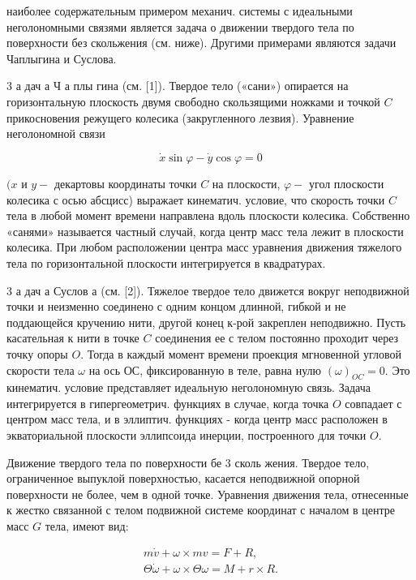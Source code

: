 \documentclass[10pt]{article}
\begin{document}
наиболее содержательным примером механич. системы с идеальными неголономными связями является задача о движении твердого тела по поверхности без скольжения (см. ниже). Другими примерами являются задачи Чаплыгина и Суслова.



3 а дач а Ч а плы гина (см. [1]). Твердое тело («сани») опирается на горизонтальную плоскость двумя свободно скользящими ножками и точкой $C$ прикосновения режущего колесика (закругленного лезвия). Уравнение неголономной связи



\[

\dot{x} \sin \varphi-\dot{y} \cos \varphi=0

\]



$(x$ и $y-$ декартовы координаты точки $C$ на плоскости, $\varphi-$ угол плоскости колесика с осью абсцисс) выражает кинематич. условие, что скорость точки $C$ тела в любой момент времени направлена вдоль плоскости колесика. Собственно «санями» называется частный случай, когда центр масс тела лежит в плоскости колесика. При любом расположении центра масс уравнения движения тяжелого тела по горизонтальной плоскости интегрируется в квадратурах.



3 а дач а Суслов а (см. [2]). Тяжелое твердое тело движется вокруг неподвижной точки и неизменно соединено с одним концом длинной, гибкой и не поддающейся кручению нити, другой конец к-рой закреплен неподвижно. Пусть касательная к нити в точке $C$ соединения ее с телом постоянно проходит через точку опоры $O$. Тогда в каждый момент времени проекция мгновенной угловой скорости тела $\omega$ на ось $О С$, фиксированную в теле, равна нулю $(\omega)_{O C}=0$. Это кинематич. условие представляет идеальную неголономную связь. Задача интегрируется в гипергеометрич. функциях в случае, когда точка $O$ совпадает с центром масс тела, и в эллиптич. функциях - когда центр масс расположен в экваториальной плоскости эллипсоида инерции, построенного для точки $O$.



Движение твердого тела по поверхности бе 3 сколь жения. Твердое тело, ограниченное выпуклой поверхностью, касается неподвижной опорной поверхности не более, чем в одной точке. Уравнения движения тела, отнесенные к жестко связанной с телом подвижной системе координат с началом в центре масс $G$ тела, имеют вид:



\[

\begin{gathered}

m \dot{v}+\omega \times m v=F+R, \\

\Theta \dot{\omega}+\omega \times \Theta \omega=M+r \times R .

\end{gathered}

\]
\end{document}
